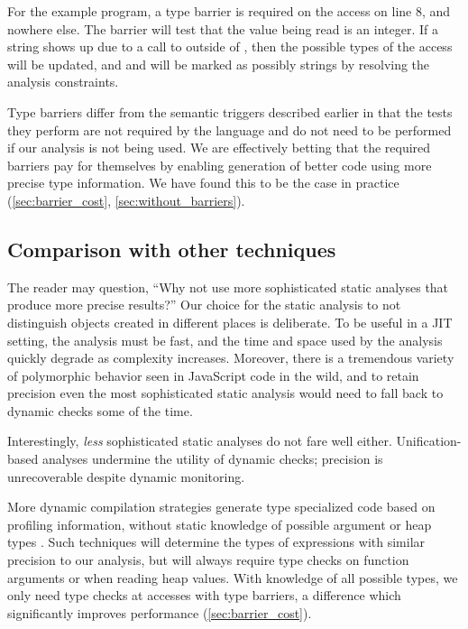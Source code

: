 For the example program, a type barrier is required on the  access
on line 8, and nowhere else. The barrier will test that the value being read
is an integer. If a string shows up due to a call to 
outside of , then the possible types of the  access
will be updated, and  and  will be marked as possibly
strings by resolving the analysis constraints.

Type barriers differ from the semantic triggers described earlier in that
the tests they perform are not required by the language
and do not need to
be performed if our analysis is not being used.
We are effectively betting that the required barriers
pay for themselves by enabling generation of better code using more precise type information.
We have found this to be the case in practice (\Section\ref{sec:barrier_cost}, \Section\ref{sec:without_barriers}).

\subsection{Comparison with other techniques}

The reader may question, ``Why not use more sophisticated static analyses that
produce more precise results?''
Our choice for the static analysis to not distinguish  objects
created in different places is deliberate.
To be useful in a JIT setting, the analysis must be fast, and the time
and space used by the analysis quickly degrade as complexity increases.
Moreover, there is a tremendous variety of polymorphic behavior seen in
JavaScript code in the wild, and to retain precision even the
most sophisticated static analysis would need to fall back to dynamic
checks some of the time.

Interestingly, \emph{less} sophisticated static
analyses do not fare well either. Unification-based analyses undermine the
utility of dynamic checks; precision is unrecoverable despite dynamic
monitoring.

More dynamic compilation strategies
generate type specialized code based on profiling
information, without static knowledge of possible argument or heap types
\cite{ChambersThesis, Chambers89}.
Such techniques will determine the types of expressions with similar
precision to our analysis,
but will always require type checks on function arguments or when reading
heap values.
With knowledge of all possible types, we only need type checks at accesses
with type barriers, a difference which significantly improves performance
(\Section\ref{sec:barrier_cost}).

